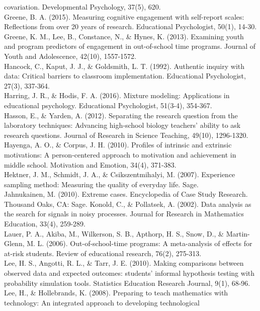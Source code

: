 \documentclass[]{msu-thesis}
\theoremstyle{definition}
\theoremstyle{definition}
\theoremstyle{definition}
\theoremstyle{remark}
\begin{document}
covariation. Developmental Psychology, 37(5), 620.\\
Greene, B. A. (2015). Measuring cognitive engagement with self-report
scales: Reflections from over 20 years of research. Educational
Psychologist, 50(1), 14-30.\\
Greene, K. M., Lee, B., Constance, N., \& Hynes, K. (2013). Examining
youth and program predictors of engagement in out-of-school time
programs. Journal of Youth and Adolescence, 42(10), 1557-1572.\\
Hancock, C., Kaput, J. J., \& Goldsmith, L. T. (1992). Authentic inquiry
with data: Critical barriers to classroom implementation. Educational
Psychologist, 27(3), 337-364.\\
Harring, J. R., \& Hodis, F. A. (2016). Mixture modeling: Applications
in educational psychology. Educational Psychologist, 51(3-4), 354-367.\\
Hasson, E., \& Yarden, A. (2012). Separating the research question from
the laboratory techniques: Advancing high‐school biology teachers'
ability to ask research questions. Journal of Research in Science
Teaching, 49(10), 1296-1320.\\
Hayenga, A. O., \& Corpus, J. H. (2010). Profiles of intrinsic and
extrinsic motivations: A person-centered approach to motivation and
achievement in middle school. Motivation and Emotion, 34(4), 371-383.\\
Hektner, J. M., Schmidt, J. A., \& Csikszentmihalyi, M. (2007).
Experience sampling method: Measuring the quality of everyday life.
Sage.\\
Jahnukainen, M. (2010). Extreme cases. Encyclopedia of Case Study
Research. Thousand Oaks, CA: Sage. Konold, C., \& Pollatsek, A. (2002).
Data analysis as the search for signals in noisy processes. Journal for
Research in Mathematics Education, 33(4), 259-289.\\
Lauer, P. A., Akiba, M., Wilkerson, S. B., Apthorp, H. S., Snow, D., \&
Martin-Glenn, M. L. (2006). Out-of-school-time programs: A meta-analysis
of effects for at-risk students. Review of educational research, 76(2),
275-313.\\
Lee, H. S., Angotti, R. L., \& Tarr, J. E. (2010). Making comparisons
between observed data and expected outcomes: students' informal
hypothesis testing with probability simulation tools. Statistics
Education Research Journal, 9(1), 68-96.\\
Lee, H., \& Hollebrands, K. (2008). Preparing to teach mathematics with
technology: An integrated approach to developing technological
\end{document}
